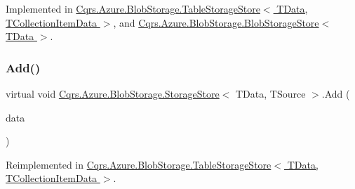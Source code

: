 Implemented in \hyperlink{classCqrs_1_1Azure_1_1BlobStorage_1_1TableStorageStore_ad9becfb4b149c645450deba342696e54_ad9becfb4b149c645450deba342696e54}{Cqrs.\+Azure.\+Blob\+Storage.\+Table\+Storage\+Store$<$ T\+Data, T\+Collection\+Item\+Data $>$}, and \hyperlink{classCqrs_1_1Azure_1_1BlobStorage_1_1BlobStorageStore_a527ef0e0d39f9e01f4112b6bc90129b2_a527ef0e0d39f9e01f4112b6bc90129b2}{Cqrs.\+Azure.\+Blob\+Storage.\+Blob\+Storage\+Store$<$ T\+Data $>$}.

\mbox{\label{classCqrs_1_1Azure_1_1BlobStorage_1_1StorageStore_a989d749e5f9efc10b1a416feec02657d_a989d749e5f9efc10b1a416feec02657d}} 
\subsubsection{\texorpdfstring{Add()}{Add()}\hspace{0.1cm}{\footnotesize\ttfamily [2/2]}}
{\footnotesize\ttfamily virtual void \hyperlink{classCqrs_1_1Azure_1_1BlobStorage_1_1StorageStore}{Cqrs.\+Azure.\+Blob\+Storage.\+Storage\+Store}$<$ T\+Data, T\+Source $>$.Add (\begin{DoxyParamCaption}\item[{I\+Enumerable$<$ T\+Data $>$}]{data }\end{DoxyParamCaption})\hspace{0.3cm}{\ttfamily [virtual]}}



Reimplemented in \hyperlink{classCqrs_1_1Azure_1_1BlobStorage_1_1TableStorageStore_a2b10c02a19150d5a68e6dcb4810ea8a1_a2b10c02a19150d5a68e6dcb4810ea8a1}{Cqrs.\+Azure.\+Blob\+Storage.\+Table\+Storage\+Store$<$ T\+Data, T\+Collection\+Item\+Data $>$}.

\mbox{\label{classCqrs_1_1Azure_1_1BlobStorage_1_1StorageStore_a07903b6c3eca8d49878deb6e2e5719e0_a07903b6c3eca8d49878deb6e2e5719e0}} 
